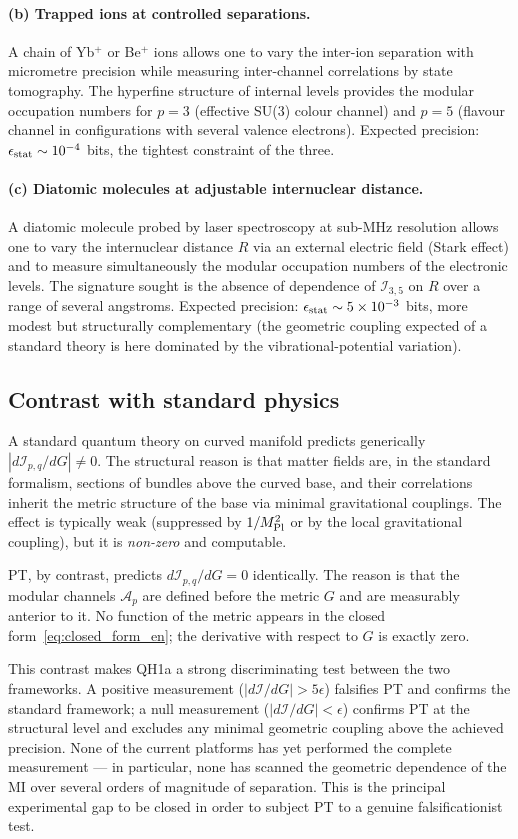 \paragraph{(b) Trapped ions at controlled separations.}
A chain of Yb$^+$ or Be$^+$ ions allows one to vary the inter-ion
separation with micrometre precision while measuring inter-channel
correlations by state tomography. The hyperfine structure of
internal levels provides the modular occupation numbers for
$p = 3$ (effective SU(3) colour channel) and $p = 5$ (flavour
channel in configurations with several valence electrons).
Expected precision: $\epsilon_{\rm stat} \sim 10^{-4}$ bits, the
tightest constraint of the three.

\paragraph{(c) Diatomic molecules at adjustable internuclear distance.}
A diatomic molecule probed by laser spectroscopy at sub-MHz
resolution allows one to vary the internuclear distance $R$ via
an external electric field (Stark effect) and to measure
simultaneously the modular occupation numbers of the electronic
levels. The signature sought is the absence of dependence of
$\mathcal{I}_{3,5}$ on $R$ over a range of several angstroms.
Expected precision: $\epsilon_{\rm stat} \sim 5 \times 10^{-3}$
bits, more modest but structurally complementary (the geometric
coupling expected of a standard theory is here dominated by the
vibrational-potential variation).

\subsection{Contrast with standard physics}
\label{ssec:qh1a_contrast_en}

A standard quantum theory on curved manifold predicts generically
$|d\mathcal{I}_{p,q}/dG| \neq 0$. The structural reason is that
matter fields are, in the standard formalism, sections of bundles
above the curved base, and their correlations inherit the metric
structure of the base via minimal gravitational couplings. The
effect is typically weak (suppressed by $1/M_{\rm Pl}^2$ or by
the local gravitational coupling), but it is \emph{non-zero} and
computable.

PT, by contrast, predicts $d\mathcal{I}_{p,q}/dG = 0$ identically.
The reason is that the modular channels $\mathcal{A}_p$ are
defined before the metric $G$ and are measurably anterior to it.
No function of the metric appears in the closed
form~\eqref{eq:closed_form_en}; the derivative with respect to $G$
is exactly zero.

This contrast makes QH1a a strong discriminating test between the
two frameworks. A positive measurement ($|d\mathcal{I}/dG| >
5\epsilon$) falsifies PT and confirms the standard framework; a
null measurement ($|d\mathcal{I}/dG| < \epsilon$) confirms PT at
the structural level and excludes any minimal geometric coupling
above the achieved precision. None of the current platforms has
yet performed the complete measurement --- in particular, none
has scanned the geometric dependence of the MI over several
orders of magnitude of separation. This is the principal
experimental gap to be closed in order to subject PT to a
genuine falsificationist test.
